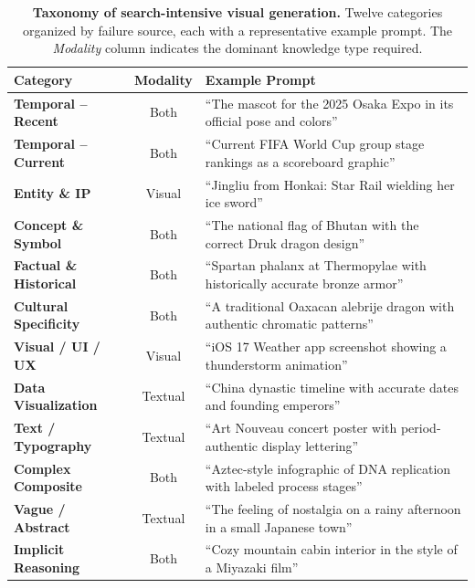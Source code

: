 \documentclass{article}
\begin{document}
\begin{table}[t]
  \centering
  \caption{\textbf{Taxonomy of search-intensive visual generation.} Twelve categories organized by failure source, each with a representative example prompt. The \emph{Modality} column indicates the dominant knowledge type required.}
  \label{tab:taxonomy}
  \small
  \renewcommand{\arraystretch}{1.1}
  \begin{tabularx}{\linewidth}{@{}lcX@{}}
  \toprule
  \textbf{Category} & \textbf{Modality} & \textbf{Example Prompt} \\
  \midrule
  \textbf{Temporal -- Recent}    & Both    & ``The mascot for the 2025 Osaka Expo in its official pose and colors'' \\
  \textbf{Temporal -- Current}   & Both & ``Current FIFA World Cup group stage rankings as a scoreboard graphic'' \\
  \textbf{Entity \& IP}          & Visual  & ``Jingliu from Honkai: Star Rail wielding her ice sword'' \\
  \textbf{Concept \& Symbol}     & Both & ``The national flag of Bhutan with the correct Druk dragon design'' \\
  \textbf{Factual \& Historical} & Both    & ``Spartan phalanx at Thermopylae with historically accurate bronze armor'' \\
  \textbf{Cultural Specificity}  & Both    & ``A traditional Oaxacan alebrije dragon with authentic chromatic patterns'' \\
  \textbf{Visual / UI / UX}      & Visual  & ``iOS 17 Weather app screenshot showing a thunderstorm animation'' \\
  \textbf{Data Visualization}    & Textual & ``China dynastic timeline with accurate dates and founding emperors'' \\
  \textbf{Text / Typography}     & Textual & ``Art Nouveau concert poster with period-authentic display lettering'' \\
  \textbf{Complex Composite}     & Both    & ``Aztec-style infographic of DNA replication with labeled process stages'' \\
  \textbf{Vague / Abstract}      & Textual & ``The feeling of nostalgia on a rainy afternoon in a small Japanese town'' \\
  \textbf{Implicit Reasoning}    & Both  & ``Cozy mountain cabin interior in the style of a Miyazaki film'' \\
  \bottomrule
  \end{tabularx}
\end{table}
\end{document}
